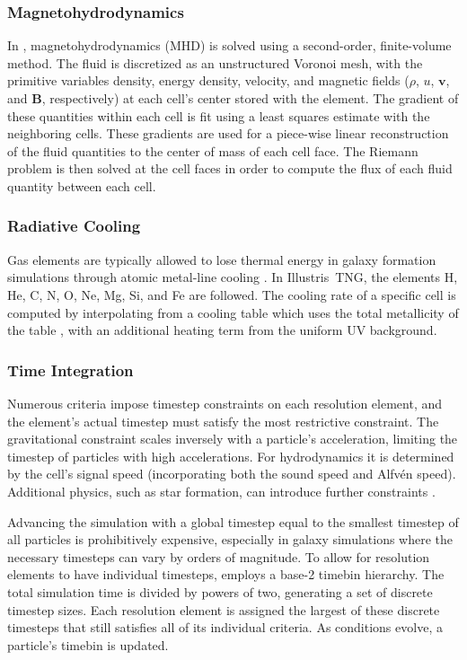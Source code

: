 \subsubsection{Magnetohydrodynamics}
In \AREPO{}, magnetohydrodynamics (MHD) is solved using a second-order, finite-volume method. The fluid is discretized as an unstructured Voronoi mesh, with the primitive variables density, energy density, velocity, and magnetic fields ($\rho$, $u$, $\mathbf{v}$, and $\mathbf{B}$, respectively) at each cell's center stored with the element. The gradient of these quantities within each cell is fit using a least squares estimate with the neighboring cells. These gradients are used for a piece-wise linear reconstruction of the fluid quantities to the center of mass of each cell face. The Riemann problem is then solved at the cell faces in order to compute the flux of each fluid quantity between each cell.

\subsubsection{Radiative Cooling}
Gas elements are typically allowed to lose thermal energy in galaxy formation simulations through atomic metal-line cooling \citep{1992ApJ...399L.109K,1996ApJS..105...19K}. In Illustris~TNG, the elements H, He, C, N, O, Ne, Mg, Si, and Fe are followed. The cooling rate of a specific cell is computed by interpolating from a cooling table which uses the total metallicity of the table \citep{2008MNRAS.385.1443S,2009MNRAS.393...99W}, with an additional heating term from the uniform UV background.

\subsubsection{Time Integration}
Numerous criteria impose timestep constraints on each resolution element, and the element's actual timestep must satisfy the most restrictive constraint. The gravitational constraint scales inversely with a particle's acceleration, limiting the timestep of particles with high accelerations. For hydrodynamics it is determined by the cell's signal speed (incorporating both the sound speed and Alfvén speed). Additional physics, such as star formation, can introduce further constraints \citep[see Section~7.1 in][]{2020ApJS..248...32W}.

Advancing the simulation with a global timestep equal to the smallest timestep of all particles is prohibitively expensive, especially in galaxy simulations where the necessary timesteps can vary by orders of magnitude. To allow for resolution elements to have individual timesteps, \AREPO{} employs a base-2 timebin hierarchy. The total simulation time is divided by powers of two, generating a set of discrete timestep sizes. Each resolution element is assigned the largest of these discrete timesteps that still satisfies all of its individual criteria. As conditions evolve, a particle's timebin is updated.


